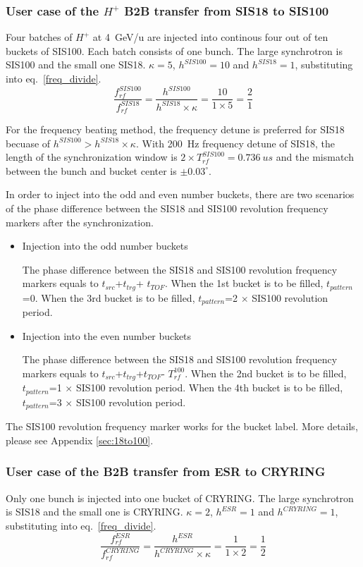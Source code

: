 \subsubsection{User case of the $H^{+}$ B2B transfer from SIS18 to SIS100}
Four batches of $H^{+}$ at \SI{4}{GeV/\atomicmassunit} are injected into continous four out of ten buckets of SIS100. Each batch consists of one bunch. The large synchrotron is SIS100 and the small one SIS18. $\kappa=5$, $h^{SIS100}=10$ and $h^{SIS18}=1$, substituting into eq.~\ref{freq_divide}.
\begin{equation}
\frac{f_{rf}^{SIS100}}{f_{rf}^{SIS18}}= \frac {h^{SIS100}}{h^{SIS18} \times \kappa}= \frac{10}{1 \times 5}=\frac{2}{1}
\end{equation}

For the frequency beating method, the frequency detune is preferred for SIS18 becuase of $h^{SIS100} > h^{SIS18} \times \kappa$. With \SI{200}{Hz} frequency detune of SIS18, the length of the synchronization window is $2 \times T_{rf}^{SIS100}=\SI{0.736}{us}$ and the mismatch between the bunch and bucket center is $\pm0.03^\circ$.


In order to inject into the odd and even number buckets, there are two scenarios of the phase difference between the SIS18 and SIS100 revolution frequency markers after the synchronization.
\begin{itemize}
	\item Injection into the odd number buckets
		
		The phase difference between the SIS18 and SIS100 revolution frequency markers equals to $t_{src}$+$t_{trg}$+ $t_{TOF}$. When the 1st bucket is to be filled, $t_{pattern}$=0. When the 3rd bucket is to be filled, $t_{pattern}$=2 $\times$ SIS100 revolution period. 
	\item Injection into the even number buckets
	
		The phase difference between the SIS18 and SIS100 revolution frequency markers equals to $t_{src}$+$t_{trg}$+$t_{TOF}$- $T_{rf}^{100}$. When the 2nd bucket is to be filled, $t_{pattern}$=1 $\times$ SIS100 revolution period. When the 4th bucket is to be filled, $t_{pattern}$=3 $\times$ SIS100 revolution period. 

\end{itemize}

The SIS100 revolution frequency marker works for the bucket label. More details, please see Appendix \ref{sec:18to100}.

\subsubsection{User case of the B2B transfer from ESR to CRYRING}
Only one bunch is injected into one bucket of CRYRING. The large synchrotron is SIS18 and the small one is CRYRING. $\kappa=2$, $h^{ESR}=1$ and $h^{CRYRING}=1$, substituting into eq.~\ref{freq_divide}. 
\begin{equation}
\frac{f_{rf}^{ESR}}{f_{rf}^{CRYRING}}= \frac {h^{ESR}}{h^{CRYRING} \times \kappa}= \frac{1}{1 \times 2}=\frac{1}{2}
\end{equation}

